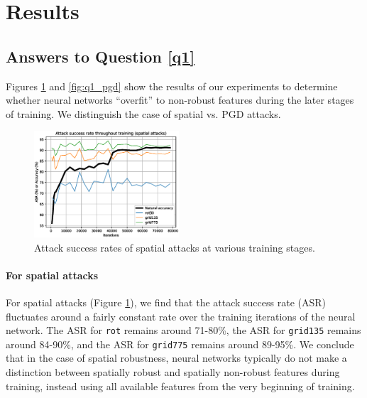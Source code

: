 \section{Results}

\subsection{Answers to Question \ref{q1}}

Figures \ref{fig:q1_spatial} and \ref{fig:q1_pgd} show the results of our experiments to determine whether neural networks ``overfit'' to non-robust features during the later stages of training. We distinguish the case of spatial vs. PGD attacks.

\begin{figure}[htb]
    \vspace{-7pt}
    \begin{center}
        \includegraphics[width=0.48\textwidth]{figs/Q1_spatial.eps}
    \end{center}
    \caption{Attack success rates of spatial attacks at various training stages.} \label{fig:q1_spatial}
    \vspace{-10pt}
\end{figure}

\paragraph{For spatial attacks} For spatial attacks (Figure \ref{fig:q1_spatial}), we find that the attack success rate (ASR) fluctuates around a fairly constant rate over the training iterations of the neural network. The ASR for \texttt{rot} remains around 71-80\%, the ASR for \texttt{grid135} remains around 84-90\%, and the ASR for \texttt{grid775} remains around 89-95\%. We conclude that in the case of spatial robustness, neural networks typically do not make a distinction between spatially robust and spatially non-robust features during training, instead using all available features from the very beginning of training.

